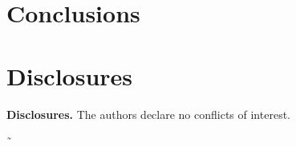 \documentclass[9pt,twocolumn,twoside,pdftex]{optica}
\begin{document}
\section{Conclusions}






\section*{Disclosures}

\medskip

\noindent\textbf{Disclosures.} The authors declare no conflicts of interest.









˜
\end{document}
